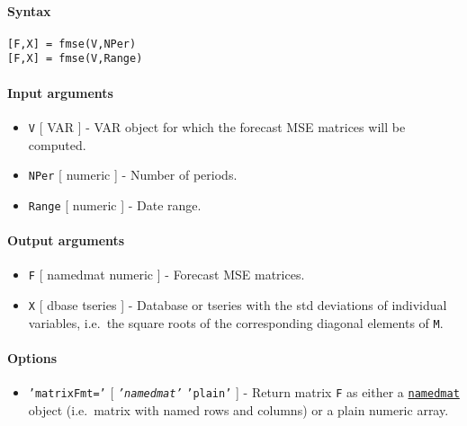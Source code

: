 


	\paragraph{Syntax}

\begin{verbatim}
[F,X] = fmse(V,NPer)
[F,X] = fmse(V,Range)
\end{verbatim}

\paragraph{Input arguments}

\begin{itemize}
\item
  \texttt{V} {[} VAR {]} - VAR object for which the forecast MSE
  matrices will be computed.
\item
  \texttt{NPer} {[} numeric {]} - Number of periods.
\item
  \texttt{Range} {[} numeric {]} - Date range.
\end{itemize}

\paragraph{Output arguments}

\begin{itemize}
\item
  \texttt{F} {[} namedmat \textbar{} numeric {]} - Forecast MSE
  matrices.
\item
  \texttt{X} {[} dbase \textbar{} tseries {]} - Database or tseries with
  the std deviations of individual variables, i.e.~the square roots of
  the corresponding diagonal elements of \texttt{M}.
\end{itemize}

\paragraph{Options}

\begin{itemize}
\itemsep1pt\parskip0pt
\item
  \texttt{'matrixFmt='} {[} \emph{\texttt{'namedmat'}} \textbar{}
  \texttt{'plain'} {]} - Return matrix \texttt{F} as either a
  \href{namedmat/Contents}{\texttt{namedmat}} object (i.e.~matrix with
  named rows and columns) or a plain numeric array.
\end{itemize}


